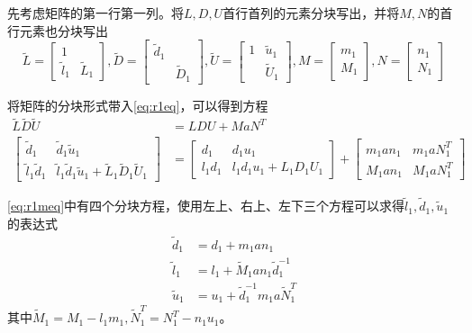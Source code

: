 \documentclass[a4paper,12pt]{article}
\begin{document}
    先考虑矩阵的第一行第一列。将$L,D,U$首行首列的元素分块写出，并将$M,N$的首行元素也分块写出
    \begin{equation}
      \widetilde L = \begin{bmatrix}
        1 & \\
        \widetilde l_1 & \widetilde L_1
      \end{bmatrix}, \widetilde D = \begin{bmatrix}
        \widetilde d_1 & \\
         & \widetilde D_1
      \end{bmatrix}, \widetilde U = \begin{bmatrix}
        1 & \widetilde u_1\\
         & \widetilde U_1
      \end{bmatrix}, M = \begin{bmatrix}
        m_1 \\ M_1
      \end{bmatrix}, N = \begin{bmatrix}
        n_1 \\ N_1
      \end{bmatrix}
    \end{equation}

    将矩阵的分块形式带入\cref{eq:r1eq}，可以得到方程
    \begin{equation}
      \label{eq:r1meq}
      \begin{aligned}
        \widetilde L \widetilde D \widetilde U &= LDU + MaN^T\\
        \begin{bmatrix}
          \widetilde d_1 & \widetilde d_1 \widetilde u_1 \\
          \widetilde l_1 \widetilde d_1 & \widetilde l_1 \widetilde d_1 \widetilde u_1 + \widetilde L_1 \widetilde D_1 \widetilde U_1
        \end{bmatrix}& = \begin{bmatrix}
          d_1 & d_1 u_1\\
          l_1 d_1 & l_1 d_1 u_1 + L_1 D_1 U_1
        \end{bmatrix} + \begin{bmatrix}
          m_1an_1&m_1aN_1^T\\
          M_1an_1&M_1aN_1^T
        \end{bmatrix}
      \end{aligned}
    \end{equation}

    \cref{eq:r1meq}中有四个分块方程，使用左上、右上、左下三个方程可以求得$\widetilde l_1, \widetilde d_1, \widetilde u_1$的表达式
    \begin{equation}
      \begin{aligned}
        \widetilde d_1 &= d_1 +m_1an_1\\
        \widetilde l_1 &= l_1+\widetilde M_1 a n_1 \widetilde d_1^{-1}\\
        \widetilde u_1 &= u_1+\widetilde d_1^{-1}m_1a\widetilde N_1^T
      \end{aligned}
    \end{equation}
    其中$\widetilde M_1=M_1-l_1m_1, \widetilde N_1^T=N_1^T-n_1u_1$。
\end{document}
